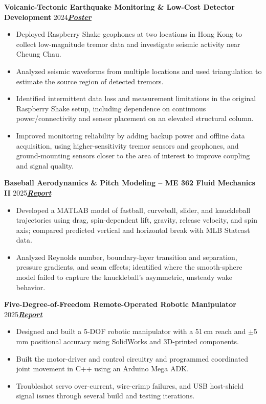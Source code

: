 \documentclass[letterpaper,10pt]{article}
\newcommand{\heading}[2]{\par\vspace{5pt}#1\hfill#2\par}
\newcommand{\link}[2]{\href{#1}{\textbf{\textit{#2}}}}
\begin{document}
\heading{\textbf{Volcanic-Tectonic Earthquake Monitoring \& Low-Cost Detector Development} \textbar{} 2024}{\link{https://docs.google.com/presentation/d/1tkdNsuMAD67OgtxQ-YM7wEmLvsL-Ea81CECaYw2BRl0/edit?usp=sharing}{Poster}}
\begin{itemize}
  \item Deployed Raspberry Shake geophones at two locations in Hong Kong to collect low-magnitude tremor data and investigate seismic activity near Cheung Chau.
  \item Analyzed seismic waveforms from multiple locations and used triangulation to estimate the source region of detected tremors.
  \item Identified intermittent data loss and measurement limitations in the original Raspberry Shake setup, including dependence on continuous power/connectivity and sensor placement on an elevated structural column.
  \item Improved monitoring reliability by adding backup power and offline data acquisition, using higher-sensitivity tremor sensors and geophones, and ground-mounting sensors closer to the area of interest to improve coupling and signal quality.
\end{itemize}

\heading{\textbf{Baseball Aerodynamics \& Pitch Modeling -- ME 362 Fluid Mechanics II} \textbar{} 2025}{\link{https://drive.google.com/file/d/170KikfBvYJqbIyHyzvZuVhXJN9q0Hq_5/view?usp=sharing}{Report}}
\begin{itemize}
  \item Developed a MATLAB model of fastball, curveball, slider, and knuckleball trajectories using drag, spin-dependent lift, gravity, release velocity, and spin axis; compared predicted vertical and horizontal break with MLB Statcast data.
  \item Analyzed Reynolds number, boundary-layer transition and separation, pressure gradients, and seam effects; identified where the smooth-sphere model failed to capture the knuckleball's asymmetric, unsteady wake behavior.
\end{itemize}

\heading{\textbf{Five-Degree-of-Freedom Remote-Operated Robotic Manipulator} \textbar{} 2025}{\link{https://drive.google.com/file/d/1YOB3gRWFRcl3RdIVAYN1r-pzPckR6uln/view?usp=sharing}{Report}}
\begin{itemize}
  \item Designed and built a 5-DOF robotic manipulator with a 51\,cm reach and $\pm$5\,mm positional accuracy using SolidWorks and 3D-printed components.
  \item Built the motor-driver and control circuitry and programmed coordinated joint movement in C++ using an Arduino Mega ADK.
  \item Troubleshot servo over-current, wire-crimp failures, and USB host-shield signal issues through several build and testing iterations.
\end{itemize}
\end{document}
